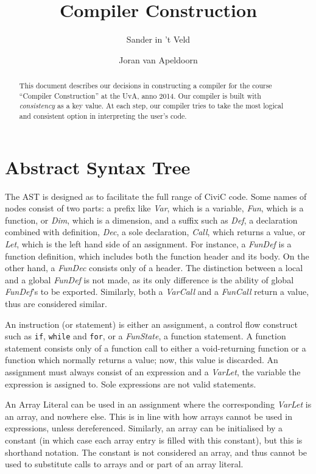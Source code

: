 \documentclass[a4paper,11pt]{report}
\title{Compiler Construction}
\author{Sander in 't Veld \and Joran van Apeldoorn}
\begin{document}
\maketitle
\tableofcontents

\begin{abstract}
This document describes our decisions in constructing a compiler for the course ``Compiler Construction'' at the UvA, anno 2014. Our compiler is built with \emph{consistency} as a key value. At each step, our compiler tries to take the most logical and consistent option in interpreting the user's code.
\end{abstract}

\chapter{Abstract Syntax Tree}
The AST is designed as to facilitate the full range of CiviC code. Some names of nodes consist of two parts: a prefix like \emph{Var}, which is a variable, \emph{Fun}, which is a function, or \emph{Dim}, which is a dimension, and a suffix such as \emph{Def}, a declaration combined with definition, \emph{Dec}, a sole declaration, \emph{Call}, which returns a value, or \emph{Let}, which is the left hand side of an assignment. For instance, a \emph{FunDef} is a function definition, which includes both the function header and its body. On the other hand, a \emph{FunDec} consists only of a header. The distinction between a local and a global \emph{FunDef} is not made, as its only difference is the ability of global \emph{FunDef}'s to be exported. Similarly, both a \emph{VarCall} and a \emph{FunCall} return a value, thus are considered similar.

An instruction (or statement) is either an assignment, a control flow construct such as \texttt{if}, \texttt{while} and \texttt{for}, or a \emph{FunState}, a function statement. A function statement consists only of a function call to either a void-returning function or a function which normally returns a value; now, this value is discarded. An assignment must always consist of an expression and a \emph{VarLet}, the variable the expression is assigned to. Sole expressions are not valid statements.

An Array Literal can be used in an assignment where the corresponding \emph{VarLet} is an array, and nowhere else. This is in line with how arrays cannot be used in expressions, unless dereferenced. Similarly, an array can be initialised by a constant (in which case each array entry is filled with this constant), but this is shorthand notation. The constant is not considered an array, and thus cannot be used to substitute calls to arrays and or part of an array literal.
\end{document}
